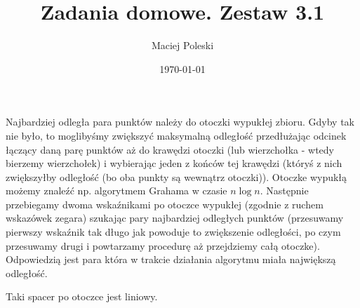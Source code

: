 \documentclass[a4paper,12pt]{article}
\title{Zadania domowe. Zestaw 3.1}
\author{Maciej Poleski}
\date{\today}
\begin{document}
\maketitle

\newpage

\section{}
Najbardziej odległa para punktów należy do otoczki wypukłej zbioru. Gdyby tak nie było, to moglibyśmy zwiększyć maksymalną odległość przedłużając odcinek łączący daną parę punktów aż do krawędzi otoczki (lub wierzchołka - wtedy bierzemy wierzchołek) i wybierając jeden z końców tej krawędzi (któryś z nich zwiększyłby odległość (bo oba punkty są wewnątrz otoczki)). Otoczke wypukłą możemy znaleźć np. algorytmem Grahama w czasie $n\log{n}$. Następnie przebiegamy dwoma wskaźnikami po otoczce wypukłej (zgodnie z ruchem wskazówek zegara) szukając pary najbardziej odległych punktów (przesuwamy pierwszy wskaźnik tak długo jak powoduje to zwiększenie odległości, po czym przesuwamy drugi i powtarzamy procedurę aż przejdziemy całą otoczke). Odpowiedzią jest para która w trakcie działania algorytmu miała największą odległość.

Taki spacer po otoczce jest liniowy.
\end{document}
